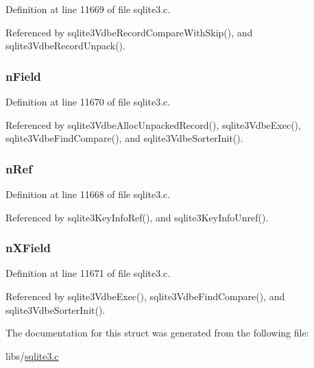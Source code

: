 Definition at line 11669 of file sqlite3.\+c.



Referenced by sqlite3\+Vdbe\+Record\+Compare\+With\+Skip(), and sqlite3\+Vdbe\+Record\+Unpack().

\hypertarget{struct_key_info_a51c97c897154719f621dbc598c86cda5}{}
\subsubsection[{n\+Field}]{ n\+Field}\label{struct_key_info_a51c97c897154719f621dbc598c86cda5}


Definition at line 11670 of file sqlite3.\+c.



Referenced by sqlite3\+Vdbe\+Alloc\+Unpacked\+Record(), sqlite3\+Vdbe\+Exec(), sqlite3\+Vdbe\+Find\+Compare(), and sqlite3\+Vdbe\+Sorter\+Init().

\hypertarget{struct_key_info_a14b3d86e39fd6defd2977d70acb45fd7}{}
\subsubsection[{n\+Ref}]{ n\+Ref}\label{struct_key_info_a14b3d86e39fd6defd2977d70acb45fd7}


Definition at line 11668 of file sqlite3.\+c.



Referenced by sqlite3\+Key\+Info\+Ref(), and sqlite3\+Key\+Info\+Unref().

\hypertarget{struct_key_info_a0cafa421d471a79f5d796d338488ee54}{}
\subsubsection[{n\+X\+Field}]{ n\+X\+Field}\label{struct_key_info_a0cafa421d471a79f5d796d338488ee54}


Definition at line 11671 of file sqlite3.\+c.



Referenced by sqlite3\+Vdbe\+Exec(), sqlite3\+Vdbe\+Find\+Compare(), and sqlite3\+Vdbe\+Sorter\+Init().



The documentation for this struct was generated from the following file\+:\begin{DoxyCompactItemize}
\item 
libs/\hyperlink{sqlite3_8c}{sqlite3.\+c}\end{DoxyCompactItemize}

